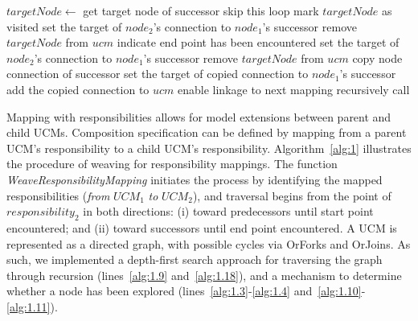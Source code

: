 \begin{algorithm}                     
	\begin{algorithmic}[1]
		
				\State $targetNode\gets$ get target node of successor
				 \label{alg:1.10}
					\State skip this loop
					\State mark $targetNode$ as visited
				\EndIf \label{alg:1.11}
				 \label{alg:1.12}
						\State set the target of $node_2$'s connection to $node_1$'s successor
						\State remove $targetNode$ from $ucm$
						\State indicate end point has been encountered
					\EndIf \label{alg:1.13}
				 \label{alg:1.14}
					\State set the target of $node_2$'s connection to $node_1$'s successor
						\State remove $targetNode$ from $ucm$
					\EndIf \label{alg:1.15}
				 \label{alg:1.16}
					\State copy node connection of successor
					\State set the target of copied connection to $node_1$'s successor
					\State add the copied connection to $ucm$
					\State enable linkage to next mapping \label{alg:1.17}
				\Else
					\State recursively call  \label{alg:1.18}
				\EndIf
			\EndFor
		\EndFunction
	\end{algorithmic}
\end{algorithm}

Mapping with responsibilities allows for model extensions between parent and child UCMs. Composition specification can be defined by mapping from a parent UCM's responsibility to a child UCM's responsibility. Algorithm~\ref{alg:1} illustrates the procedure of weaving for responsibility mappings. The function \emph{WeaveResponsibilityMapping} initiates the process by identifying the mapped responsibilities (\emph{from} $UCM_1$ \emph{to} $UCM_2$), and traversal begins from the point of $responsibility_2$ in both directions: (i) toward predecessors until start point encountered; and (ii) toward successors until end point encountered. A UCM is represented as a directed graph, with possible cycles via {\cls OrFork}s and {\cls OrJoin}s. As such, we implemented a depth-first search approach for traversing the graph through recursion (lines~\ref{alg:1.9} and~\ref{alg:1.18}), and a mechanism to determine whether a node has been explored (lines~\ref{alg:1.3}-\ref{alg:1.4} and~\ref{alg:1.10}-\ref{alg:1.11}).

